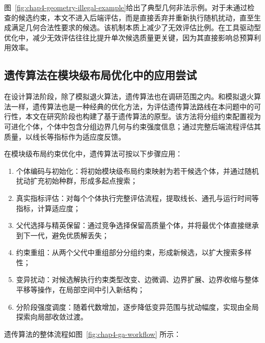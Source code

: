 图~\ref{fig:chap4-geometry-illegal-example}给出了典型几何非法示例。对于未通过检查的候选约束，本文不进入后端评估，而是直接丢弃并重新执行随机扰动，直至生成满足几何合法性要求的候选。该机制本质上减少了无效评估比例。在工具驱动型优化中，减少无效评估往往比提升单次候选质量更关键，因为其直接影响总预算利用效率。

\subsection{遗传算法在模块级布局优化中的应用尝试}
\label{sec:chap4-ga-application}

在设计算法阶段，除了模拟退火算法，遗传算法也在调研范围之内。和模拟退火算法一样，遗传算法也是一种经典的优化方法，为评估遗传算法路线在本问题中的可行性，本文在研究阶段也构建了基于遗传算法的原型。该方法将分组约束配置视为可进化个体，个体中包含分组边界几何与约束强度信息；通过完整后端流程评估其质量，以线长等指标作为适应度反馈。

在模块级布局约束优化中，遗传算法可按以下步骤应用：
\begin{enumerate}
    \item 个体编码与初始化：将初始模块级布局约束映射为若干候选个体，并通过随机扰动扩充初始种群，形成多起点搜索；
    \item 真实指标评估：对每个个体执行完整评估流程，提取线长、通孔与运行时间等指标，计算适应度；
    \item 父代选择与精英保留：通过竞争选择保留高质量个体，并将最优个体直接继承到下一代，避免优质解丢失；
    \item 约束重组：从两个父代中重组部分分组约束，形成新候选，以扩大搜索多样性；
    \item 变异扰动：对候选解执行约束类型改变、边微调、边界扩展、边界收缩与整体平移等操作，在局部空间中引入新结构；
    \item 分阶段强度调度：随着代数增加，逐步降低变异范围与扰动幅度，实现由全局探索向局部收敛过渡。
\end{enumerate}
遗传算法的整体流程如图~\ref{fig:chap4-ga-workflow} 所示：

